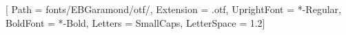 %
%
%
%
\newfontfamily{}[
  Path = fonts/EBGaramond/otf/, Extension = .otf,
  UprightFont = *-Regular, BoldFont = *-Bold,
  Letters = SmallCaps, LetterSpace = 1.2]

\renewcommand{\mcmTitleFormat}[1]{%
  {\ifmcmTitleUppercase\mcmTitleFontSC\else\mcmDisplayFont\fi #1}%
}

%
%
\mcmTitleUppercasetrue

